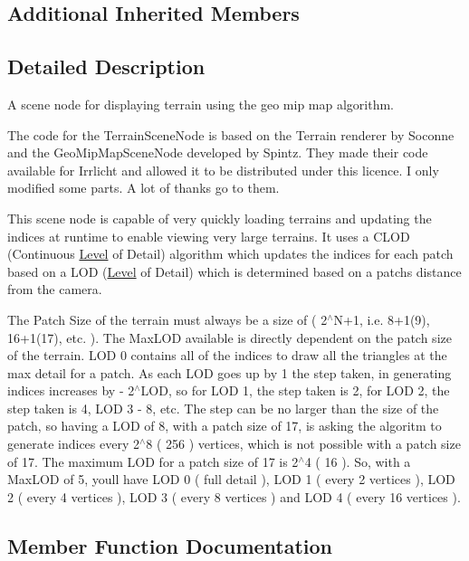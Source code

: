 \subsection*{Additional Inherited Members}


\subsection{Detailed Description}
A scene node for displaying terrain using the geo mip map algorithm. 

The code for the Terrain\+Scene\+Node is based on the Terrain renderer by Soconne and the Geo\+Mip\+Map\+Scene\+Node developed by Spintz. They made their code available for Irrlicht and allowed it to be distributed under this licence. I only modified some parts. A lot of thanks go to them.

This scene node is capable of very quickly loading terrains and updating the indices at runtime to enable viewing very large terrains. It uses a C\+L\+OD (Continuous \hyperlink{classLevel}{Level} of Detail) algorithm which updates the indices for each patch based on a L\+OD (\hyperlink{classLevel}{Level} of Detail) which is determined based on a patch\textquotesingle{}s distance from the camera.

The Patch Size of the terrain must always be a size of ( 2$^\wedge$\+N+1, i.\+e. 8+1(9), 16+1(17), etc. ). The Max\+L\+OD available is directly dependent on the patch size of the terrain. L\+OD 0 contains all of the indices to draw all the triangles at the max detail for a patch. As each L\+OD goes up by 1 the step taken, in generating indices increases by -\/ 2$^\wedge$\+L\+OD, so for L\+OD 1, the step taken is 2, for L\+OD 2, the step taken is 4, L\+OD 3 -\/ 8, etc. The step can be no larger than the size of the patch, so having a L\+OD of 8, with a patch size of 17, is asking the algoritm to generate indices every 2$^\wedge$8 ( 256 ) vertices, which is not possible with a patch size of 17. The maximum L\+OD for a patch size of 17 is 2$^\wedge$4 ( 16 ). So, with a Max\+L\+OD of 5, you\textquotesingle{}ll have L\+OD 0 ( full detail ), L\+OD 1 ( every 2 vertices ), L\+OD 2 ( every 4 vertices ), L\+OD 3 ( every 8 vertices ) and L\+OD 4 ( every 16 vertices ). 

\subsection{Member Function Documentation}
\mbox{\label{classirr_1_1scene_1_1ITerrainSceneNode_a02a14fe28f5a326fca819c36bee2e92e}} 
